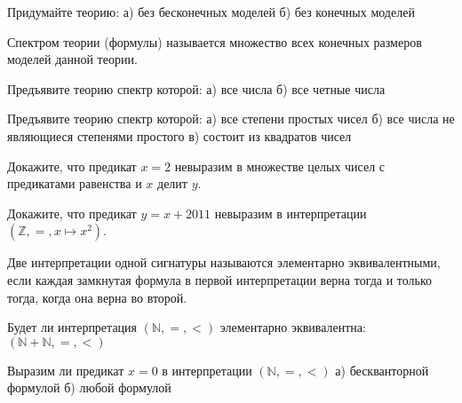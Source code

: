 \setcounter{curtask}{18}


\begin{task}
    Придумайте теорию:
    а) без бесконечных моделей
    б) без конечных моделей
\end{task}

Спектром теории (формулы) называется множество всех конечных размеров моделей данной
теории.

\begin{task}
    Предъявите теорию спектр которой:
    а) все числа
    б) все четные числа
\end{task}

\begin{task}
    Предъявите теорию спектр которой:
    а) все степени простых чисел
    б) все числа не являющиеся степенями простого
    в) состоит из квадратов чисел
\end{task}

\begin{task}
    Докажите, что предикат $x = 2$ невыразим в множестве целых чисел с
    предикатами равенства и $x$ делит $y$.
\end{task}

\begin{task}
    Докажите, что предикат $y = x + 2011$ невыразим в интерпретации
    $(\mathbb{Z}, =, x \mapsto x^2)$.
\end{task}

Две интерпретации одной сигнатуры называются элементарно
эквивалентными, если каждая замкнутая формула в первой интерпретации
верна тогда и только тогда, когда она верна во второй.

\begin{task}
    Будет ли интерпретация $(\mathbb{N}, =, <)$ элементарно
    эквивалентна: $(\mathbb{N} + \mathbb{N}, =, <)$
\end{task}

\begin{task}
    Выразим ли предикат $x = 0$ в интерпретации $(\mathbb{N}, =, <)$
    а) бескванторной формулой
    б) любой формулой
\end{task}